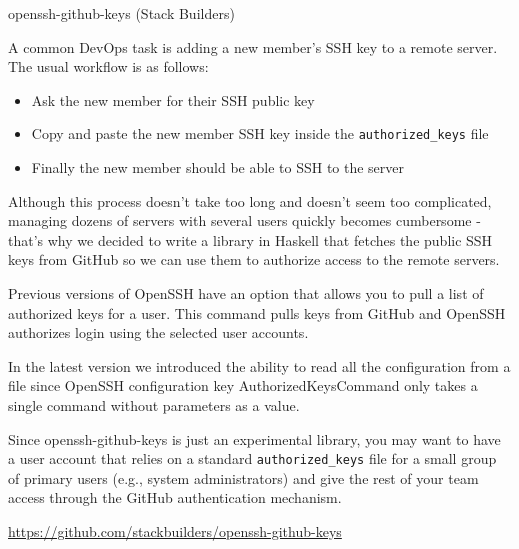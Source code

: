 \documentclass[DIV16,twocolumn,10pt]{scrreprt}
\begin{document}
\begin{hcarentry}{openssh-github-keys (Stack Builders)}
\makeheader

A common DevOps task is adding a new member's SSH key to a remote server. The
usual workflow is as follows:

\begin{itemize}
  \item Ask the new member for their SSH public key
  \item Copy and paste the new member SSH key inside the \texttt{authorized\_keys} file
  \item Finally the new member should be able to SSH to the server
\end{itemize}

Although this process doesn't take too long and doesn't seem too complicated,
managing dozens of servers with several users quickly becomes cumbersome -
that's why we decided to write a library in Haskell that fetches the public SSH
keys from GitHub so we can use them to authorize access to the remote servers.

Previous versions of OpenSSH have an option that allows you to pull a list of
authorized keys for a user. This command pulls keys from GitHub and OpenSSH authorizes
login using the selected user accounts.

In the latest version we introduced the ability to read all the configuration from a
file since OpenSSH configuration key AuthorizedKeysCommand only takes a
single command without parameters as a value.

Since openssh-github-keys is just an experimental library, you may want to have
a user account that relies on a standard \texttt{authorized\_keys} file for a small group
of primary users (e.g., system administrators) and give the rest of your team
access through the GitHub authentication mechanism.

\FurtherReading
  \url{https://github.com/stackbuilders/openssh-github-keys}
\end{hcarentry}
\end{document}
